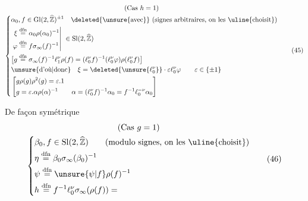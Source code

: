 \[
\begin{gathered}
\text{(Cas }h=1\text{)}\\
\left\{
\begin{aligned}
 &\alpha_0,f\in\mathrm{Gl}(2,\widehat{\mathbb Z})^{\pm1}
 \quad \deleted{\unsure{\text{avec}}}\ \text{(signes arbitraires, on les \uline{choisit})}\\
 &\left.
 \begin{aligned}
 \xi&\overset{\mathrm{dfn}}=\alpha_0\rho(\alpha_0)^{-1}\\
 \varphi&\overset{\mathrm{dfn}}=f\sigma_\infty(f)^{-1}
 \end{aligned}
 \right|\ \in\mathrm{Sl}(2,\widehat{\mathbb Z})\\
 &\bigl[g\overset{\mathrm{dfn}}=\sigma_\infty(f)^{-1}\ell_1^\nu\rho(f)
 =(\ell_0^\nu f)^{-1}(\ell_0^\nu\varphi)\rho(\ell_0^\nu f)\bigr]\\
 &\text{\unsure{d'où|donc}}\quad
 \xi=\deleted{\unsure{\ell_0^{\nu}}}\cdot\varepsilon\ell_0^\nu\varphi
 \qquad\varepsilon\in\{\pm1\}\\
 &\left[\begin{aligned}
 &g\rho(g)\rho^2(g)=\varepsilon.1\\
 &g=\varepsilon.\alpha\rho(\alpha)^{-1}
 \qquad\alpha=(\ell_0^\nu f)^{-1}\alpha_0=f^{-1}\ell_0^{-\nu}\alpha_0
 \end{aligned}\right]
\end{aligned}
\right.
\end{gathered}
\tag{45}
\]


De façon symétrique
\[
\begin{gathered}
\text{(Cas }g=1\text{)}\\
\left\{
\begin{aligned}
 &\beta_0,f\in\mathrm{Sl}(2,\widehat{\mathbb Z})
 \qquad\text{(modulo signes, on les \uline{choisit})}\\
 &\eta\overset{\mathrm{dfn}}=\beta_0\sigma_\infty(\beta_0)^{-1}\\
 &\psi\overset{\mathrm{dfn}}=\unsure{\psi|f}\rho(f)^{-1}\\
 &h\overset{\mathrm{dfn}}=f^{-1}\ell_0^\nu\sigma_\infty(\rho(f))=
\end{aligned}
\right.
\end{gathered}
\tag{46}
\]

